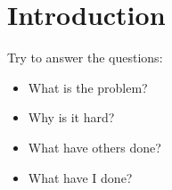 \section{Introduction}

Try to answer the questions:
\begin{itemize}
\item What is the problem?
\item Why is it hard?
\item What have others done?
\item What have I done? \cite{Antelmi2018a}
\end{itemize}
